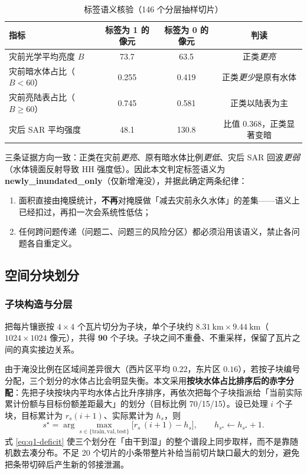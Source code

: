 \begin{table}[H]
\centering
\caption{标签语义核验（146 个分层抽样切片）}
\label{tab:q1-label}
\begin{tabular}{lccc}
\toprule
指标 & 标签为 1 的像元 & 标签为 0 的像元 & 判读 \\
\midrule
灾前光学平均亮度 $B$          & 73.7 & 63.5 & 正类\emph{更亮} \\
灾前暗水体占比（$B<60$）      & 0.255 & 0.419 & 正类\emph{更少}是原有水体 \\
灾前亮陆表占比（$B\ge60$）    & 0.745 & 0.581 & 正类以陆表为主 \\
灾后 SAR 平均强度             & 48.1 & 130.8 & 比值 $0.368$，正类显著变暗 \\
\bottomrule
\end{tabular}
\end{table}

三条证据方向一致：正类在灾前\emph{更亮}、原有暗水体比例\emph{更低}、灾后 SAR 回波\emph{更弱}（水体镜面反射导致 HH 强度低）。因此本文判定标签语义为 \textbf{newly\_inundated\_only}（仅新增淹没），并据此确定两条纪律：

\begin{enumerate}
\item 面积直接由掩膜统计，\textbf{不再}对掩膜做「减去灾前永久水体」的差集——语义上已经扣过，再扣一次会系统性低估；
\item 任何跨问题传递（问题二、问题三的风险分区）都必须沿用该语义，禁止各问题各自重定义。
\end{enumerate}

\subsection{空间分块划分}
\label{sec:q1-split}

\subsubsection{子块构造与分层}

把每片镶嵌按 $4\times4$ 个瓦片切分为子块，单个子块约 $8.31\ \mathrm{km}\times9.44\ \mathrm{km}$（$1024\times1024$ 像元），共得 \textbf{90} 个子块。子块之间不重叠、不重采样，保留了瓦片之间的真实接边关系。

由于淹没比例在区域间差异很大（西片区平均 $0.22$，东片区 $0.16$），若按子块编号分配，三个划分的水体占比会明显失衡。本文采用\textbf{按块水体占比排序后的赤字分配}：先把子块按块内平均水体占比升序排序，再依次把每个子块指派给「当前实际累计份额与目标份额差距最大」的划分（目标比例 70/15/15）。设已处理 $i$ 个子块，目标累计为 $r_s(i+1)$、实际累计为 $h_s$，则
\begin{equation}
s^{\star}=\arg\max_{s\in\{\text{train},\text{val},\text{test}\}}\big[r_s\,(i+1)-h_s\big],
\qquad h_{s^{\star}}\leftarrow h_{s^{\star}}+1 .
\label{eq:q1-deficit}
\end{equation}
式 \eqref{eq:q1-deficit} 使三个划分在「由干到湿」的整个谱段上同步取样，而不是靠随机数去凑分布。不足 20 个切片的小条带整片补给当前切片缺口最大的划分，避免把条带切碎后产生新的邻接泄漏。

